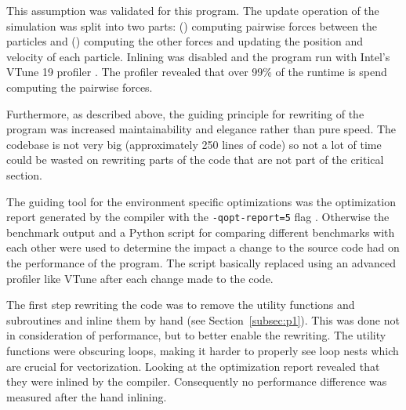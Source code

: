 \documentclass[twoside,11pt]{article}
\begin{document}
This assumption was validated for this program.
The update operation of the simulation was split into two parts:
() computing pairwise forces between the particles and
() computing the other forces and updating the position
and velocity of each particle.
Inlining was disabled and the program run with Intel's VTune 19
profiler \citep{vtune}.
The profiler revealed that over 99\% of the runtime is spend computing
the pairwise forces.

Furthermore, as described above, the guiding principle for rewriting
of the program was increased maintainability and elegance rather than
pure speed.
The codebase is not very big (approximately 250 lines of code) so not
a lot of time could be wasted on rewriting parts of the code that are
not part of the critical section.

The guiding tool for the environment specific optimizations was the
optimization report generated by the compiler with the
\texttt{-qopt-report=5} flag \citep{qopt_report}.
Otherwise the benchmark output and a Python script for comparing
different benchmarks with each other were used to determine the impact
a change to the source code had on the performance of the program.
The script basically replaced using an advanced profiler like VTune
after each change made to the code.

The first step rewriting the code was to remove the utility functions
and subroutines and inline them by hand (see Section~\ref{subsec:p1}).
This was done not in consideration of performance, but to better
enable the rewriting.
The utility functions were obscuring loops, making it harder to
properly see loop nests which are crucial for vectorization.
Looking at the optimization report revealed that they were inlined
by the compiler.
Consequently no performance difference was measured after the hand
inlining.
\end{document}

